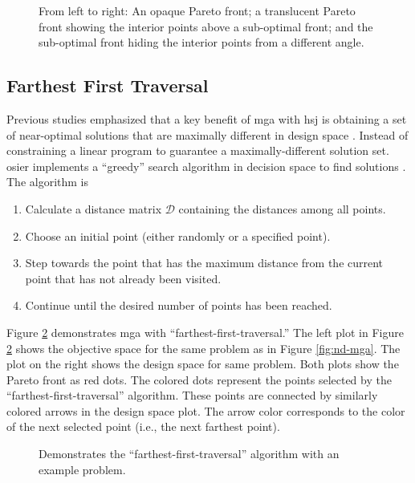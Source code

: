 \begin{figure}[H]
  \centering
  \resizebox{1\columnwidth}{!}{}
  \caption{From left to right: An opaque Pareto front; a translucent Pareto front 
  showing the interior points above a sub-optimal front; and the sub-optimal front 
  hiding the interior points from a different angle.}
  \label{fig:3d-mga}
\end{figure}

\subsection{Farthest First Traversal}
Previous studies emphasized that a key benefit of \ac{mga} with \ac{hsj} is
obtaining a set of near-optimal solutions that are maximally different in design
space \cite{decarolis_modelling_2016, yue_review_2018-1}. Instead of
constraining a linear program to guarantee a maximally-different solution set.
\ac{osier} implements a ``greedy'' search algorithm in decision space to find
solutions \cite{hochbaum_best_1985}. The algorithm is
\begin{enumerate}
  \item Calculate a distance matrix $\mathcal{D}$ containing the distances among
  all points. 
  \item Choose an initial point (either randomly or a specified point).
  \item Step towards the point that has the maximum distance from the current
  point that has not already been visited.
  \item Continue until the desired number of points has been reached.
\end{enumerate}

Figure \ref{fig:mga-fft} demonstrates \ac{mga} with
``farthest-first-traversal.'' The left plot in Figure \ref{fig:mga-fft} shows
the objective space for the same problem as in Figure \ref{fig:nd-mga}. The plot
on the right shows the design space for same problem. Both plots show the Pareto
front as red dots. The colored dots represent the points selected by the ``farthest-first-traversal''
algorithm. These points are connected by similarly colored arrows in the design space plot. The arrow
color corresponds to the color of the next selected point (i.e., the next farthest point).

\begin{figure}[H]
  \centering
  \resizebox{1\columnwidth}{!}{}
  \caption{Demonstrates the ``farthest-first-traversal'' algorithm with an example problem.}
  \label{fig:mga-fft}
\end{figure}